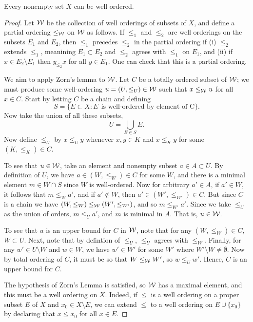 \documentclass[12pt]{article} %
\begin{document}
\begin{principle}
    Every nonempty set $X$ can be well ordered.
\end{principle}

\begin{proof}
    Let $\mathcal{W}$ be the collection of well orderings of subsets of $X$, and define a partial ordering $\leq_{\mathcal{W}}$ on $\mathcal{W}$ as follows. If $\leq_1$ and $\leq_2$ are well orderings on the subsets $E_1$ and $E_2$, then $\leq_1$ precedes $\leq_2$ in the partial ordering if (i) $\leq_2$ extends $\leq_1$, meanining $E_1 \subset E_2$ and $\leq_2$ agrees with $\leq_1$ on $E_1$, and (ii) if $x \in E_2 \setminus E_1$ then $y_{\leq_2} x$ for all $y \in E_1$. One can check that this is a partial ordering.

    We aim to apply Zorn's lemma to $\mathcal{W}$. Let $C$ be a totally ordered subset of $\mathcal{W}$; we must produce some well-ordering $u = (U, \leq_U) \in \mathcal{W}$ such that $x \leq_{\mathcal{W}} u$ for all $x \in C$. Start by letting $C$ be a chain and defining \[S = \{E \subset X : E \ \ \text{is well-ordered by element of C}\}.\] Now take the union of all these subsets, \[U = \bigcup_{E \in S} E.\] Now define $\leq_U$ by $x \leq_U y$ whenever $x, y \in K$ and $x \leq_K y$ for some $(K, \leq_K) \in C$.

    To see that $u \in \mathcal{W}$, take an element and nonempty subset $a \in A \subset U$. By definition of $U$, we have $a \in (W, \leq_W) \in C$ for some $W$, and there is a minimal element $m \in W \cap S$ since $W$ is well-ordered. Now for arbitrary $a' \in A$, if $a' \in W$, it follows that $m \leq_W a'$, and if $a' \notin W$, then $a' \in (W', \leq_{W'}) \in C$. But since $C$ is a chain we have $(W, \leq_W) \leq_{\mathcal{W}} (W', \leq_{W'})$, and so $m \leq_{W'} a'$. Since we take $\leq_U$ as the union of orders, $m \leq_U a'$, and $m$ is minimal in $A$. That is, $u \in \mathcal{W}$.

    To see that $u$ is an upper bound for $C$ in $\mathcal{W}$, note that for any $(W, \leq_W) \in C$, $W \subset U$. Next, note that by defintion of $\leq_U$, $\leq_U$ agrees with $\leq_W$. Finally, for any $w' \in U \setminus W$ and $w \in W$, we have $w' \in W'$ for some $W'$ where $W' \setminus W \neq \emptyset$. Now by total ordering of $C$, it must be so that $W \leq_{\mathcal{W}} W'$, so $w \leq_U w'$. Hence, $C$ is an upper bound for $C$.

    The hypothesis of Zorn's Lemma is satisfied, so $\mathcal{W}$ has a maximal element, and this must be a well ordering on $X$. Indeed, if $\leq$ is a well ordering on a proper subset $E$ of $X$ and $x_0 \in X \setminus E$, we can extend $\leq$ to a well ordering on $E \cup \{x_0\}$ by declaring that $x \leq x_0$ for all $x \in E$.
\end{proof}
\end{document}
